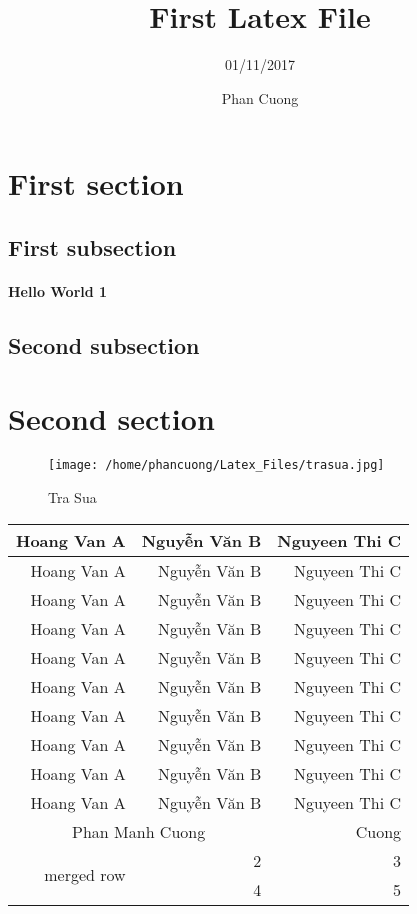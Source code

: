 \documentclass[a4paper,13pt]{article}
\begin{document}
\title{First Latex File}
\author{01/11/2017}
\date{Phan Cuong}
\maketitle
\section{First section}
\subsection{First subsection}
\paragraph{Hello World 1}
\subsection{Second subsection}
\section{Second section}
\begin{figure}[h]
\centering
\texttt{[image: /home/phancuong/Latex\_Files/trasua.jpg]}
\caption{Tra Sua}
\label{}
\end{figure}
\begin{longtable}{|r|r|r|}
\hline
Hoang Van A&Nguyễn Văn B&Nguyeen Thi C\\
\hline
Hoang Van A&Nguyễn Văn B&Nguyeen Thi C\\
\hline
Hoang Van A&Nguyễn Văn B&Nguyeen Thi C\\
\hline
Hoang Van A&Nguyễn Văn B&Nguyeen Thi C\\
\hline
Hoang Van A&Nguyễn Văn B&Nguyeen Thi C\\
\hline
Hoang Van A&Nguyễn Văn B&Nguyeen Thi C\\
\hline
Hoang Van A&Nguyễn Văn B&Nguyeen Thi C\\
\hline
Hoang Van A&Nguyễn Văn B&Nguyeen Thi C\\
\hline
Hoang Van A&Nguyễn Văn B&Nguyeen Thi C\\
\hline
Hoang Van A&Nguyễn Văn B&Nguyeen Thi C\\
\hline
\multicolumn{2}{|c|}{Phan Manh Cuong}&Cuong \\
\hline
\multirow{2}{*}{merged row}&2&3\\
\hhline{~--}
&4&5\\
\hline
\end{longtable}
\end{document}
